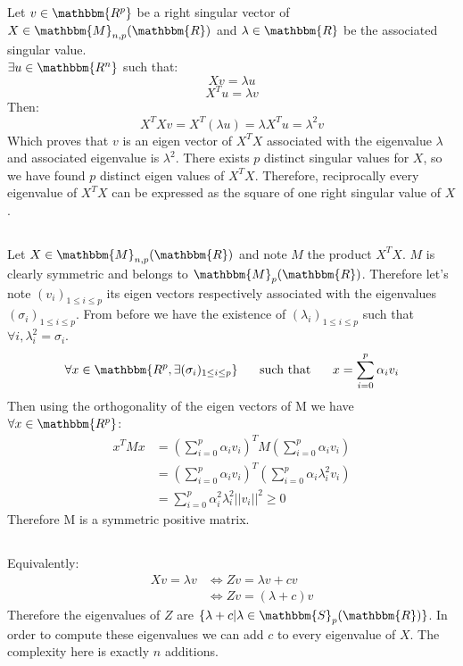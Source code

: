 \documentclass{llncs}\usepackage[]{graphicx}\usepackage[]{color}
\begin{document}
\subsection{}
Let $v \in \mathbbm{R^{p}} $ be a right singular vector of $X \in \mathbbm{M}_{n,p}(\mathbbm{R})$ and $\lambda \in \mathbbm{R}$ be the associated singular value.\\
$\exists u \in \mathbbm{R^{n}}$ such that:
\begin{equation}
Xv=\lambda u
\end{equation}
\begin{equation}
X^{T}u= \lambda v
\end{equation}
Then:
\begin{equation}
X^{T}Xv=X^{T}(\lambda u)=\lambda X^{T}u={\lambda}^{2}v
\end{equation}
Which proves that $v$ is an eigen vector of $X^{T}X$ associated with the eigenvalue $\lambda$ and associated eigenvalue is ${\lambda}^{2}$. There exists $p$ distinct singular values for $X$, so we have found $p$ distinct eigen values of $X^{T}X$. Therefore, reciprocally every eigenvalue of $X^{T}X$ can be expressed as the square of one right singular value of $X$.
\subsection{}
Let $X \in \mathbbm{M}_{n,p}(\mathbbm{R})$ and note $M$ the product $X^{T}X$. $M$ is clearly symmetric and belongs to $\mathbbm{M}_{p}(\mathbbm{R})$. Therefore let's note $(v_{i})_{1\leq i\leq p}$ its eigen vectors respectively associated with the eigenvalues $({\sigma}_{i})_{1\leq i\leq p}$. From before we have the existence of 
$({\lambda}_{i})_{1\leq i\leq p}$ such that $\forall i,{\lambda}_{i}^{2} = {\sigma}_{i} $.
\begin{equation}
\forall x \in \mathbbm{R^{p}, \exists ({\sigma}_{i})_{1\leq i\leq p} } \hspace{.5cm}\mbox{ such that }\hspace{.5cm} x=\sum_{i=0}^{p}{\alpha}_{i}v_{i}
\end{equation}
Then using the orthogonality of the eigen vectors of M we have $\forall x \in \mathbbm{R^{p}}$:
\begin{align}
x^{T}Mx&=(\sum_{i=0}^{p}{\alpha}_{i}v_{i})^{T}M(\sum_{i=0}^{p}{\alpha}_{i}v_{i}) \nonumber\\
&=(\sum_{i=0}^{p}{\alpha}_{i}v_{i})^{T}(\sum_{i=0}^{p}{\alpha}_{i}{\lambda}_{i}^{2}v_{i})
\nonumber\\
&=\sum_{i=0}^{p}{\alpha}_{i}^{2}{\lambda}_{i}^{2}{||v_{i}||}^{2} \geq 0
\end{align}
Therefore M is a symmetric positive matrix.
\subsection{}
Equivalently:
\begin{align}
Xv=\lambda v  &\iff Zv=\lambda v+ cv \nonumber\\
&\iff Zv=(\lambda + c)v
\end{align}
Therefore the eigenvalues of $Z$ are $\{{\lambda+c | \lambda \in \mathbbm{ S}_{p}(\mathbbm{R})}\}$. In order to compute these eigenvalues we can add $c$ to every eigenvalue of $X$. The complexity here is exactly $n$ additions.
\end{document}
